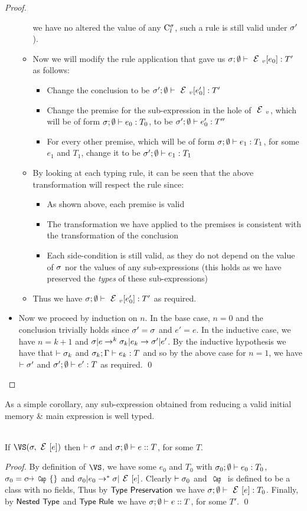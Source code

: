 \begin{proof}
\begin{itemize}
\begin{itemize}
			we have no altered the value of any $\C[\s]l$, such a rule is still
			valid under $\s'$).
			\item Now we will modify the rule application that gave us $\tyr{\EV[e_0]}{T'}$
			as follows:
			\begin{itemize}
				\item Change the conclusion to be $\tyr[\s']{\EV[e'_0]}{T'}$
				\item Change the premise for the sub-expression in the hole of $\EV$, which
				will be of form $\tyr{e_0}{T_0}$, to be $\tyr[\s']{e'_0}{T''}$
				\item For every other premise, which will be of form $\tyr{e_1}{T_1}$,
				for some $e_1$ and $T_1$, change it to be $\tyr[\s']{e_1}{T_1}$
			\end{itemize}
			\item By looking at each typing rule, it can be seen that the above transformation
			will respect the rule since:
			\begin{itemize}
				\item As shown above, each premise is valid
				\item The transformation we have applied to the premises is consistent with
				the transformation of the conclusion
				\item Each side-condition is still valid, as they do not depend on the value
				of $\s$ nor the values of any sub-expressions (this holds as we have
				preserved the \emph{types} of these sub-expressions)
			\end{itemize}
			\item Thus we have $\tyr{\EV[e'_0]}{T'}$ as required.
		\end{itemize}
	\item Now we proceed by induction on $n$. In the base case, $n = 0$ and
	the conclusion trivially holds since $\s' = \s$ and $e' = e$. In the
	inductive case, we have $n = k+1$ and $\s|e\rightarrow^{k}\s_k|e_k\rightarrow\s'|e'$.
	By the inductive hypothesis we have that $\vdash\s_k$ and $\ty[\s_k][\G]{e_k}T$
	and so by the above case for $n = 1$, we have $\vdash\s'$ and $\tyr[\s']{e'}T$
	as required.
	\qed\end{itemize}
\end{proof}


As a simple corollary, any sub-expression obtained from reducing a valid initial memory \& main expression is well typed.

\SS\begin{Corollary}\ \\
	\indent If $\VS(\s,\E[e])$ then $\vdash\s$ and $\tyer eT$, for some $T$.
\end{Corollary}
\SS\begin{proof}
	By definition of $\VS$, we have some $e_0$ and $T_0$ with $\tyr[\s_0]{e_0}T_0$,
	$\s_0 = c\mapsto\Kw{Cap}\{\}$ and $\s_0|e_0\rightarrow^*\s|\E[e]$. Clearly
	$\vdash\s_0$ and $\Kw{Cap}$ is defined to be a class with no fields,
	Thus by $\thm{Type Preservation}$ we have $\tyr {\E[e]}{T_0}$.
	Finally, by $\thm{Nested Type}$ and $\thm{Type Rule}$ we have
	$\tyer eT$, for some
	$T'$.
\qed\end{proof}

